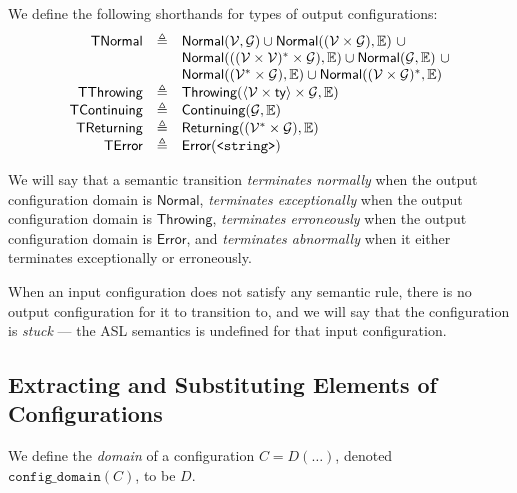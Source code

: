 \documentclass{book}
\newcommand\XGraphs[0]{\mathcal{G}}
\newcommand\vals[0]{\mathcal{V}}
\newcommand\configdomain[1]{\texttt{config\_domain}({#1})}
\newcommand\TNormal[0]{\textsf{TNormal}}
\newcommand\TError[0]{\textsf{TError}}
\newcommand\TThrowing[0]{\textsf{TThrowing}}
\newcommand\TContinuing[0]{\textsf{TContinuing}}
\newcommand\TReturning[0]{\textsf{TReturning}}
\newcommand\Normal[0]{\textsf{Normal}}
\newcommand\Throwing[0]{\textsf{Throwing}}
\newcommand\Continuing[0]{\textsf{Continuing}}
\newcommand\Returning[0]{\textsf{Returning}}
\newcommand\Error[0]{\textsf{Error}}
\begin{document}
We define the following shorthands for types of output configurations:
\[
  \begin{array}{rcl}
    \TNormal          & \triangleq & \Normal(\vals, \XGraphs) \cup \Normal((\vals \times \XGraphs), \envs)\ \cup \\
                      &            & \Normal(((\vals \times \vals)^* \times \XGraphs), \envs) \cup  \Normal(\XGraphs, \envs)\ \cup   \\
                      &            & \Normal((\vals^* \times \XGraphs), \envs) \cup \Normal((\vals\times\XGraphs)^*, \envs)\\
    \TThrowing        & \triangleq & \Throwing(\langle\vals \times \ty\rangle \times \XGraphs, \envs)\\
    \TContinuing      & \triangleq & \Continuing(\XGraphs, \envs)\\
    \TReturning       & \triangleq & \Returning((\vals^* \times \XGraphs), \envs)\\
    \TError           & \triangleq & \Error(\texttt{<string>})\\
  \end{array}
\]

We will say that a semantic transition \emph{terminates normally} when the output configuration domain is $\Normal$,
\emph{terminates exceptionally} when the output configuration domain is $\Throwing$,
\emph{terminates erroneously} when the output configuration domain is $\Error$,
and \emph{terminates abnormally} when it either terminates exceptionally or erroneously.

When an input configuration does not satisfy any semantic rule,
there is no output configuration for it to transition to, and we will say that
the configuration is \emph{stuck} --- the ASL semantics is undefined for that
input configuration.

\subsection{Extracting and Substituting Elements of Configurations}

We define the \emph{domain} of a configuration $C=D(\ldots)$, denoted $\configdomain{C}$, to be $D$.
\end{document}
